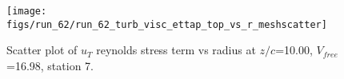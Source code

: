\begin{figure}[H]
\centering
\texttt{[image: figs/run\_62/run\_62\_turb\_visc\_ettap\_top\_vs\_r\_meshscatter]}
\caption{Scatter plot of $
u_T$ reynolds stress term vs radius at $z/c$=10.00, $V_{free}$=16.98, station 7.}
\end{figure}


